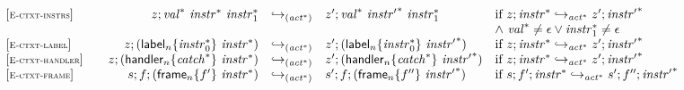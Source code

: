 $$
\begin{array}[t]{@{}lrcl@{}l@{}}
{[\textsc{\scriptsize E{-}ctxt{-}instrs}]} \quad & z ; {{\mathit{val}}^\ast}~{{\mathit{instr}}^\ast}~{{\mathit{instr}}_1^\ast} & {\hookrightarrow}_{({{\mathit{act}}^\ast})} {} & {z'} ; {{\mathit{val}}^\ast}~{{\mathit{instr}'}^\ast}~{{\mathit{instr}}_1^\ast} & \quad
\begin{array}[t]{@{}l@{}}
\mbox{if}~ z ; {{\mathit{instr}}^\ast} \hookrightarrow_{{{\mathit{act}}^\ast}} {z'} ; {{\mathit{instr}'}^\ast} \\
{\land}~ {{\mathit{val}}^\ast} \neq \epsilon \lor {{\mathit{instr}}_1^\ast} \neq \epsilon \\
\end{array} \\
{[\textsc{\scriptsize E{-}ctxt{-}label}]} \quad & z ; ({{\mathsf{label}}_{n}}{\{ {{\mathit{instr}}_0^\ast} \}}~{{\mathit{instr}}^\ast}) & {\hookrightarrow}_{({{\mathit{act}}^\ast})} {} & {z'} ; ({{\mathsf{label}}_{n}}{\{ {{\mathit{instr}}_0^\ast} \}}~{{\mathit{instr}'}^\ast}) & \quad \mbox{if}~ z ; {{\mathit{instr}}^\ast} \hookrightarrow_{{{\mathit{act}}^\ast}} {z'} ; {{\mathit{instr}'}^\ast} \\
{[\textsc{\scriptsize E{-}ctxt{-}handler}]} \quad & z ; ({{\mathsf{handler}}_{n}}{\{ {{\mathit{catch}}^\ast} \}}~{{\mathit{instr}}^\ast}) & {\hookrightarrow}_{({{\mathit{act}}^\ast})} {} & {z'} ; ({{\mathsf{handler}}_{n}}{\{ {{\mathit{catch}}^\ast} \}}~{{\mathit{instr}'}^\ast}) & \quad \mbox{if}~ z ; {{\mathit{instr}}^\ast} \hookrightarrow_{{{\mathit{act}}^\ast}} {z'} ; {{\mathit{instr}'}^\ast} \\
{[\textsc{\scriptsize E{-}ctxt{-}frame}]} \quad & s ; f ; ({{\mathsf{frame}}_{n}}{\{ {f'} \}}~{{\mathit{instr}}^\ast}) & {\hookrightarrow}_{({{\mathit{act}}^\ast})} {} & {s'} ; f ; ({{\mathsf{frame}}_{n}}{\{ {f''} \}}~{{\mathit{instr}'}^\ast}) & \quad \mbox{if}~ s ; {f'} ; {{\mathit{instr}}^\ast} \hookrightarrow_{{{\mathit{act}}^\ast}} {s'} ; {f''} ; {{\mathit{instr}'}^\ast} \\
\end{array}
$$

\vspace{1ex}

